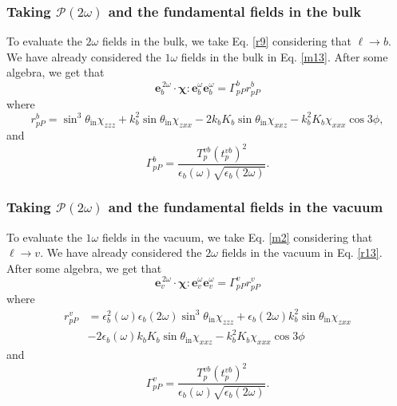 \documentclass[10pt]{article}
\begin{document}
\subsubsection{Taking \texorpdfstring{$\mathcal{P}(2\omega)$}{P(2w)} and the
fundamental fields in the bulk}

To evaluate the $2\omega$ fields in the bulk, we
take Eq. \eqref{r9} considering that $\ell\rightarrow b$. We have already
considered the $1\omega$ fields in the bulk in Eq. \eqref{m13}. After some
algebra, we get that
\begin{equation*}
\mathbf{e}^{\,2\omega}_{b}\cdot
\boldsymbol{\chi}:\mathbf{e}^{\omega}_{b}\mathbf{e}^{\omega}_{b} =
\Gamma^{b}_{pP}r^{b}_{pP}
\end{equation*}
where
\begin{equation*}
r^{b}_{pP} = 
  \sin^{3}\theta_{\mathrm{in}}\chi_{zzz} 
+ k^{2}_{b}\sin\theta_{\mathrm{in}}\chi_{zxx}
- 2k_{b}K_{b}\sin\theta_{\mathrm{in}}\chi_{xxz}
- k^{2}_{b}K_{b}\chi_{xxx}\cos3\phi,
\end{equation*}
and
\begin{equation*}
\Gamma^{b}_{pP} =
\frac{T_{p}^{vb}\left(t^{vb}_{p}\right)^{2}}
     {\epsilon_{b}(\omega)\sqrt{\epsilon_{b}(2\omega)}}.
\end{equation*}


\subsubsection{Taking \texorpdfstring{$\mathcal{P}(2\omega)$}{P(2w)} and the
fundamental fields in the vacuum}

To evaluate the $1\omega$ fields in the vacuum, we take Eq. \eqref{m2}
considering that $\ell\rightarrow v$. We have already considered the $2\omega$
fields in the vacuum in Eq. \eqref{r13}. After some algebra, we get that
\begin{equation*}
\mathbf{e}^{\,2\omega}_{v}\cdot
\boldsymbol{\chi}:\mathbf{e}^{\omega}_{v}\mathbf{e}^{\omega}_{v} =
\Gamma^{v}_{pP}r^{v}_{pP}
\end{equation*}
where
\begin{equation*}
\begin{split}
r^{v}_{pP} &=
    \epsilon^{2}_{b}(\omega)\epsilon_{b}(2\omega)
    \sin^{3}\theta_{\mathrm{in}}\chi_{zzz}
 +  \epsilon_{b}(2\omega)k^{2}_{b}\sin\theta_{\mathrm{in}}\chi_{zxx}\\
&- 2\epsilon_{b}(\omega)k_{b}K_{b}\sin\theta_{\mathrm{in}}\chi_{xxz}
 -  k^{2}_{b}K_{b}\chi_{xxx}\cos3\phi
\end{split}
\end{equation*}
and
\begin{equation*}
\Gamma^{v}_{pP} =
\frac{T^{v b}_{p}\left(t^{v b}_{p}\right)^{2}}
     {\epsilon_{b}(\omega)\sqrt{\epsilon_{b}(2\omega)}}.
\end{equation*}
\end{document}
